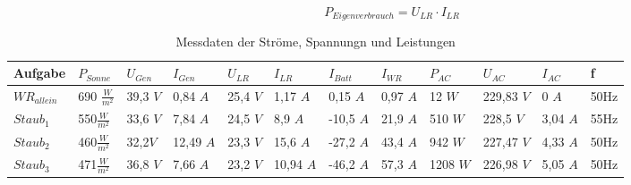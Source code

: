 \begin{equation}
	P_{ Eigenverbrauch }= U_{ LR} \cdot I_{ LR }
\label{eq:230509_Eigenverbrauch}
\end{equation} 


\begin{table}[!ht]
    \caption{Messdaten der Ströme, Spannungn und Leistungen }
	\centering
	\small
	\renewcommand{\arraystretch}{2}
\begin{tabularx}{\linewidth}{|l|l|X|X|X|X|X|X|X|X|X|X|}
\hline
\rowcolor[HTML]{76B900} 
{\color[HTML]{000000} Aufgabe}          & {\color[HTML]{000000} $P_{Sonne}$} & {\color[HTML]{000000} $U_{Gen}$} & {\color[HTML]{000000} $I_{Gen}$} & {\color[HTML]{000000} $U_{LR}$} & {\color[HTML]{000000} $I_{LR}$} & {\color[HTML]{000000} $I_{Batt}$} & {\color[HTML]{000000} $I_{WR}$} & {\color[HTML]{000000} $P_{AC}$} & {\color[HTML]{000000} $U_{AC}$} & {\color[HTML]{000000} $I_{AC}$} & {\color[HTML]{000000} f} \\ \hline
\rowcolor[HTML]{FFFFFF} 
\cellcolor[HTML]{CFE5A8}${WR}_{allein}$      & 690 $\frac{W}{m^2}$                            & 39,3 $V$                         & 0,84 $A$                         & 25,4                        $V$ & 1,17 $A$                        & 0,15  $A$                         & 0,97                        $A$ & 12 $W$                          & 229,83 $V$                      & 0                           $A$ & 50Hz                       \\ \hline
\rowcolor[HTML]{FFFFFF} 
\cellcolor[HTML]{CFE5A8}$Staub_{1}$        & 550$\frac{W}{m^2}$                                                        & 33,6 $V$                         & 7,84  $A$                        & 24,5                        $V$ & 8,9 $A$                         & -10,5 $A$                         & 21,9                        $A$ & 510 $W$                         & 228,5 $V$                       & 3,04                        $A$ & 55Hz\\ \hline
\rowcolor[HTML]{FFFFFF} 
\cellcolor[HTML]{CFE5A8}$Staub_{2}$        & 460$\frac{W}{m^2}$                                                        & 32,2$V$                          & 12,49 $A$                        & 23,3                        $V$ & 15,6 $A$                        & -27,2 $A$                         & 43,4                        $A$ & 942 $W$                         & 227,47   $V$                    & 4,33                        $A$ & 50Hz\\ \hline
\rowcolor[HTML]{FFFFFF} 
\cellcolor[HTML]{CFE5A8}$Staub_{3}$        & 471$\frac{W}{m^2}$                                                        & 36,8 $V$                         & 7,66  $A$                        & 23,2                        $V$ & 10,94 $A$                       & -46,2 $A$                         & 57,3                        $A$ & 1208 $W$                        & 226,98    $V$                   & 5,05                        $A$ & 50Hz\\ \hline

\end{tabularx}
\end{table}
